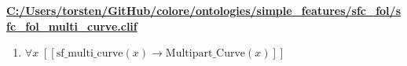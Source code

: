\documentclass{article}
\begin{document}
\textbf{\url{C:/Users/torsten/GitHub/colore/ontologies/simple\_features/sfc\_fol/sfc\_fol\_multi\_curve.clif}}

\begin{enumerate}
\item $\forall x\;  \left[ \left[ \textrm{sf\_multi\_curve}(x) \rightarrow \textrm{Multipart\_Curve}(x) \right] \right]$
\end{enumerate}
\end{document}
